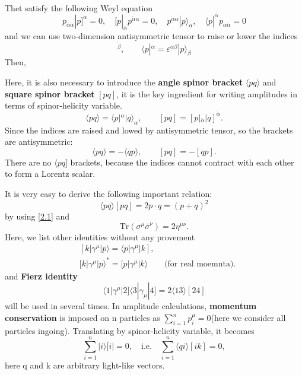 \documentclass[12pt]{article}
\numberwithin{equation}{section}
\newcommand{\avg}[1]{\langle #1 \rangle}
\newcommand{\aket}[1]{|#1\rangle}
\newcommand{\sket}[1]{|#1]}
\newcommand{\cbrak}[2]{\avg{#1}\![#2]}
\begin{document}
Thet satisfy the following Weyl equation
\begin{equation}
    p_{\alpha\dot{\alpha}}\sket{p}^{\dot{\alpha}}=0,\quad [p|_{\dot{\alpha}}p^{\dot{\alpha}\alpha}=0,\quad p^{\dot{\alpha}\alpha}\aket{p}_\alpha,\quad \langle p|^\alpha p_{\alpha\dot{\alpha}}=0
\end{equation}
and we can use two-dimension antisymmetric tensor to raise or lower the indices
\begin{equation}
    [p|_{\dot{\alpha}}=\varepsilon _{\dot{\alpha}\dot{\beta}}\sket{p}^{\dot{\beta}},\qquad \langle p|^\alpha=\varepsilon^{\alpha\beta}\aket{p}_{\beta}
\end{equation}
\noindent
Then,


\vspace{1em}
Here, it is also necessary to introduce the \textbf{angle spinor bracket} $\avg{pq}$ and \textbf{square spinor bracket} $[pq]$, it is the key ingredient for writing amplitudes in terms of spinor-helicity variable.
\begin{equation}
    \avg{pq}=\langle p|^\alpha \aket{q}_\alpha,\qquad [pq]=[p|_{\dot{\alpha}}|q]^{\dot{\alpha}}.
\end{equation}
Since the indices are raised and lowed by antisymmetric tensor, so the brackets are antisymmetric:
\begin{equation}
    \avg{pq}=-\avg{qp},\qquad [pq]=-[qp].
\end{equation}
There are no $\langle pq]$ brackets, because the indices cannot contract with each other to form a Lorentz scalar.

It is very easy to derive the following important relation:
\begin{equation}
    \cbrak{pq}{pq}=2p\cdot q= (p+q)^2
    \label{2.7}
\end{equation}
by using \eqref{2.1} and 
\begin{equation*}
    \mathrm{Tr}(\sigma^\mu \bar{\sigma}^\nu)=2\eta^{\mu\nu}.
\end{equation*}
Here, we list other identities without any provement
\begin{align}
    &[k|\gamma^\mu\aket{p}=\langle p|\gamma^\mu |k],\\
    &{[k|\gamma^\mu\aket{p}}^*=[p|\gamma^\mu\aket{k} \qquad \text{(for real moemnta)}.
\end{align}
and \textbf{Fierz identity}
\begin{equation}
    \langle 1|\gamma^\mu |2]\langle 3|\gamma_\mu |4]=2\cbrak{13}{24}
\end{equation}
will be used in several times.
In amplitude calculations, \textbf{momentum conservation} is imposed on n particles as $\sum_{i=1}^{n}p_i^\mu=0$(here we consider all particles ingoing). Translating by 
spinor-helicity variable, it becomes
\begin{equation}
   \sum_{i=1}^{n}\aket{i}[i|=0,\quad \text{i.e.}\quad \sum_{i=1}^{n}\cbrak{qi}{ik}=0,
\end{equation}
here q and k are arbitrary light-like vectors.
\end{document}

